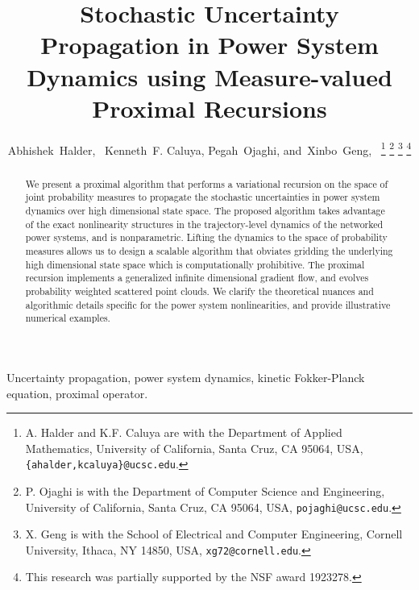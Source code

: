 \documentclass[10pt,twocolumn]{IEEEtran}
\begin{document}
\title{\LARGE \bf Stochastic Uncertainty Propagation in Power System Dynamics using Measure-valued Proximal Recursions}

\author{Abhishek~Halder,~ 
        Kenneth~F. Caluya,
        Pegah~Ojaghi,
        and~Xinbo~Geng,~%
\thanks{A. Halder and K.F. Caluya are with the Department of Applied Mathematics, University of California, Santa Cruz, CA 95064, USA, {\texttt{\{ahalder,kcaluya\}@ucsc.edu}}.}%
\thanks{P. Ojaghi is with the Department of Computer Science and Engineering, University of California, Santa Cruz, CA 95064, USA, {\texttt{pojaghi@ucsc.edu}}.}%
\thanks{X. Geng is with the School of Electrical and Computer Engineering, Cornell University, Ithaca, NY 14850, USA, {\texttt{xg72@cornell.edu}}.} %
\thanks{This research was partially supported by the NSF award 1923278.}}%

\maketitle

\begin{abstract}
We present a proximal algorithm that performs a variational recursion on the space of joint probability measures to propagate the stochastic uncertainties in power system dynamics over high dimensional state space. The proposed algorithm takes advantage of the exact nonlinearity structures in the trajectory-level dynamics of the networked power systems, and is nonparametric. Lifting the dynamics to the space of probability measures allows us to design a scalable algorithm that obviates gridding the underlying high dimensional state space which is computationally prohibitive. The proximal recursion implements a generalized infinite dimensional gradient flow, and evolves probability weighted scattered point clouds. We clarify the theoretical nuances and algorithmic details specific for the power system nonlinearities, and provide illustrative numerical examples.
\end{abstract}

\begin{IEEEkeywords}
Uncertainty propagation, power system dynamics, kinetic Fokker-Planck equation, proximal operator.
\end{IEEEkeywords}
\end{document}
